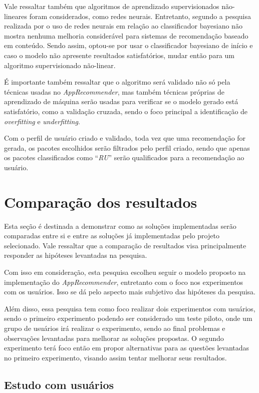 Vale ressaltar também que algoritmos de aprendizado supervisionados não-lineares foram considerados, como redes neurais. Entretanto, segundo
a pesquisa realizada por \cite{pazzani1997learning} o uso de redes neurais em relação ao classificador bayesiano não mostra nenhuma melhoria
considerável para sistemas de recomendação baseado em conteúdo. Sendo assim, optou-se por usar o
classificador bayesiano de início e caso o modelo não apresente
resultados satisfatórios, mudar então para um algoritmo supervisionado não-linear.

É importante também ressaltar que o algoritmo será validado não só pela técnicas
usadas no \textit{AppRecommender}, mas também técnicas próprias de
aprendizado de máquina serão usadas para verificar se o modelo gerado está
satisfatório, como a validação cruzada, sendo o foco principal a
identificação de \textit{overfitting} e \textit{underfitting}.

Com o perfil de usuário criado e validado, toda vez que uma recomendação for gerada, os pacotes escolhidos serão filtrados pelo perfil criado,
sendo que apenas os pacotes classificados como ``\textit{RU}'' serão qualificados para a recomendação ao usuário.

\section{Comparação dos resultados}

Esta seção é destinada a demonstrar como as soluções implementadas serão
comparadas entre si e entre as soluções já implementadas pelo projeto
selecionado. Vale ressaltar que a comparação de resultados visa principalmente
responder as hipóteses levantadas na pesquisa.

Com isso em consideração, esta pesquisa escolheu seguir o modelo proposto na
implementação do \textit{AppRecommender}, entretanto com o foco nos experimentos
com os usuários. Isso se dá pelo aspecto mais subjetivo das hipóteses da
pesquisa.

Além disso, essa pesquisa tem como foco realizar dois experimentos com usuários,
sendo o primeiro experimento podendo ser considerado um teste piloto, onde um
grupo de usuários irá realizar o experimento, sendo ao final problemas e
observações levantadas para melhorar as soluções propostas. O segundo
experimento terá foco então em propor alternativas para as questões levantadas
no primeiro experimento, visando assim tentar melhorar seus resultados.

\subsection{Estudo com usuários}\label{sec:estudo_usuario}


